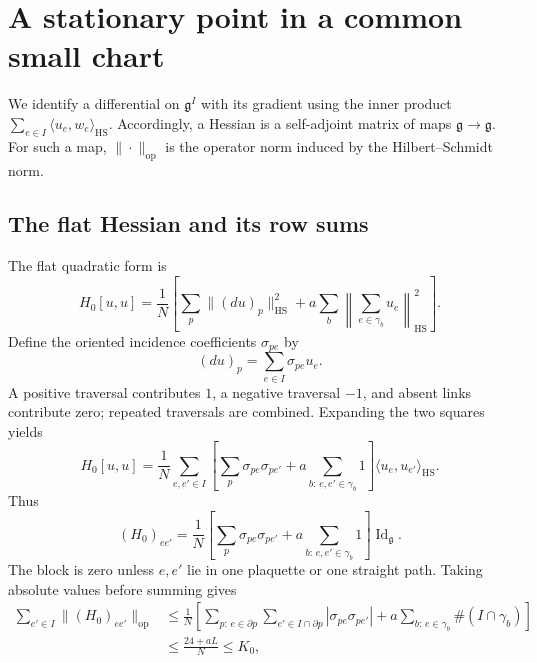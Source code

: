 \documentclass[10pt,reqno]{amsart}
\theoremstyle{definition}
\theoremstyle{remark}
\numberwithin{equation}{section}
\numberwithin{figure}{section}
\newcommand{\g}{\mathfrak g}
\begin{document}
\section{A stationary point in a common small chart}\label{sec:straight-stationary-point}
We identify a differential on $\g^I$ with its gradient using the inner
product $\sum_{e\in I}\langle u_e,w_e\rangle_{\mathrm{HS}}$.
Accordingly, a Hessian is a self-adjoint matrix of maps $\g\to\g$.
For such a map, $\|\cdot\|_{\mathrm{op}}$ is the operator norm induced
by the Hilbert--Schmidt norm.

\subsection{The flat Hessian and its row sums}
The flat quadratic form is
\begin{equation}\label{eq:flat-hessian-recalled}
H_0[u,u]=\frac1N\left[
\sum_p\|(du)_p\|_{\mathrm{HS}}^2
+a\sum_b\left\|\sum_{e\in\gamma_b}u_e\right\|_{\mathrm{HS}}^2\right].
\end{equation}
Define the oriented incidence coefficients $\sigma_{pe}$ by
\begin{equation}\label{eq:plaquette-incidence-coefficients}
(du)_p=\sum_{e\in I}\sigma_{pe}u_e.
\end{equation}
A positive traversal contributes $1$, a negative traversal $-1$,
and absent links contribute zero; repeated traversals are combined.
Expanding the two squares yields
\begin{equation}\label{eq:flat-hessian-component-expansion}
H_0[u,u]=\frac1N\sum_{e,e'\in I}
\left[\sum_p\sigma_{pe}\sigma_{pe'}
+a\sum_{b:\,e,e'\in\gamma_b}1\right]
\langle u_e,u_{e'}\rangle_{\mathrm{HS}}.
\end{equation}
Thus
\begin{equation}\label{eq:flat-hessian-matrix-blocks}
\boxed{(H_0)_{ee'}=\frac1N\left[
\sum_p\sigma_{pe}\sigma_{pe'}
+a\sum_{b:\,e,e'\in\gamma_b}1\right]\operatorname{Id}_\g.}
\end{equation}
The block is zero unless $e,e'$ lie in one plaquette or one straight
path. Taking absolute values before summing gives
\begin{equation}\label{eq:flat-hessian-absolute-row-sum}
\begin{aligned}
\sum_{e'\in I}\|(H_0)_{ee'}\|_{\mathrm{op}}
&\le\frac1N\left[
\sum_{p:\,e\in\partial p}\sum_{e'\in I\cap\partial p}
|\sigma_{pe}\sigma_{pe'}|
+a\sum_{b:\,e\in\gamma_b}\#(I\cap\gamma_b)\right]\\
&\le\frac{24+aL}{N}\le K_0,
\end{aligned}
\end{equation}
\end{document}
